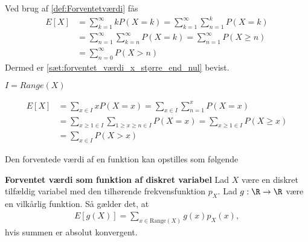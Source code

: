\begin{bev} \textbf{} 
\newline
Ved brug af \autoref{def:Forventetværdi} fås
\begin{align*}
    E[X]&=\sum_{k=1}^\infty k P(X=k)=\sum_{k=1}^\infty \sum_{n=1}^k P(X=k)\\
    &=\sum_{n=1}^\infty \sum_{k=n}^\infty P(X=k)=\sum_{n=1}^\infty P(X\geq n)\\
    &=\sum_{n=0}^\infty P(X>n)
    \end{align*}
Dermed er \autoref{sæt:forventet_værdi_x_større_end_nul} bevist.

$I = Range(X)$

\begin{align*}
    E[X]&=\sum_{x\in I} xP(X=x)=\sum_{x\in I} \sum_{n=1}^xP(X=x)\\
    &=\sum_{x\geq1\in I} \sum_{1\geq x\geq n\in I}P(X=x)=\sum_{x\geq1\in I} P(X\geq x)\\
    &=\sum_{x\in I} P(X>x)
\end{align*}

\end{bev}
\fi

Den forventede værdi af en funktion kan opstilles som følgende

\begin{minipage}\textwidth
\begin{pro} \textbf{Forventet værdi som funktion af diskret variabel} \label{prop:forventet_værdi_af_funktion} %
\newline
Lad $X$ være en diskret tilfældig variabel med den tilhørende frekvensfunktion $p_X$. Lad $g: \R \to \R$ være en vilkårlig funktion. Så gælder det, at
\begin{align}
    E\left[g(X)\right]=\sum_{x \in \text{Range}(X)} g(x)p_X(x),
\end{align}
hvis summen er absolut konvergent.
\end{pro}
\end{minipage}

